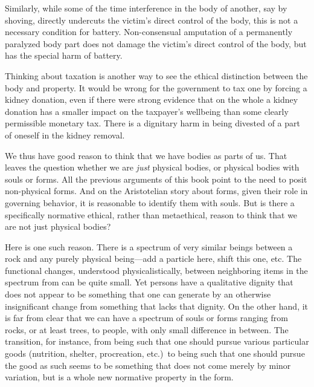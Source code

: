 Similarly, while some of the time interference in the body of another, say by shoving, directly 
undercuts the victim's direct control of the body, this is not a necessary condition for battery.
Non-consensual amputation of a permanently paralyzed body part does not damage the victim's direct
control of the body, but has the special harm of battery.

Thinking about taxation is another way to see the ethical distinction between the body and property.
It would be wrong for the government to tax one by forcing a kidney donation, even if there were strong
evidence that on the whole a kidney donation has a smaller impact on the taxpayer's wellbeing than some
clearly permissible monetary tax. There is a dignitary harm in being divested of a part of oneself in the 
kidney removal.

We thus have good reason to think that we have bodies as parts of us. That leaves the question whether
we are \textit{just} physical bodies, or physical bodies with souls or forms. All the previous arguments of this
book point to the need to posit non-physical forms. And on the Aristotelian story about forms, given their
role in governing behavior, it is reasonable to identify them with souls. But is there a specifically 
normative ethical, rather than metaethical, reason to think that we are not just physical bodies? 

Here is one such reason. There is a spectrum of very similar beings between a rock and any 
purely physical being---add a particle here, shift this one, etc. The functional changes, understood 
physicalistically, between neighboring items in the spectrum from can be quite small. Yet persons have 
a qualitative dignity that does not appear to be something that one can generate by an otherwise 
insignificant change from something that lacks that dignity. On the other hand, it is far from clear that 
we can have a spectrum of souls or forms ranging from rocks, or at least trees, to people, with only 
small difference in between. The transition, for instance, from being such that one should pursue various
particular goods (nutrition, shelter, procreation, etc.)\ to being such that one should pursue the good as 
such seems to be something that does not come merely by minor variation, but is a whole new normative property
in the form.

